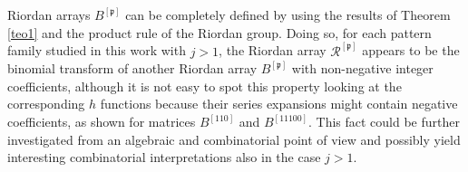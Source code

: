 Riordan arrays $B^{[\mathfrak{p}]}$ can be completely defined by using the results of Theorem \ref{teo1} and the product rule of the Riordan group.
Doing so, for each pattern family studied in this work with $j>1$,
the Riordan array $\mathcal{R}^{[\mathfrak{p}]}$  appears to be the binomial transform of another Riordan array $B^{[\mathfrak{p}]}$
 with non-negative integer coefficients, although
it is not easy to spot this property looking at the corresponding $h$ functions because their
series expansions might contain negative coefficients, as shown for matrices
$B^{[110]}$ and $B^{[11100]}$.  This fact could  be further investigated from an algebraic and combinatorial point of view and
possibly yield interesting combinatorial interpretations also in the
case $j>1.$


\iffalse

%
%

